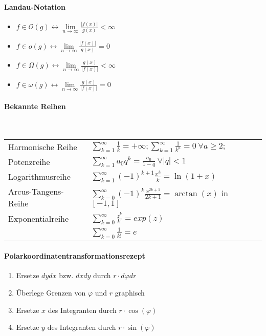 \documentclass[paper=a3,paper=landscape, fontsize=9pt, DIV=30]{scrartcl}
\newcommand{\laO}{\mathcal{O}}
\begin{document}
\begin{multicols*}{4}
		\paragraph{Landau-Notation}
		\begin{itemize}
			\item $f \in \laO(g) \leftrightarrow \lim\limits_{n \rightarrow \infty} \frac{\lvert f(x) \rvert}{g(x)} < \infty$
			\item $f \in o(g) \leftrightarrow \lim\limits_{n \rightarrow \infty} \frac{\lvert f(x) \rvert}{g(x)} = 0$
			\item $f \in \Omega(g) \leftrightarrow \lim\limits_{n \rightarrow \infty} \frac{g(x)}{\lvert f(x) \rvert} < \infty$
			\item $f \in \omega(g) \leftrightarrow \lim\limits_{n \rightarrow \infty} \frac{g(x)}{\lvert f(x) \rvert} = 0$
		\end{itemize}
		

        \paragraph{Bekannte Reihen}\hspace{0pt}\\
        \begin{tabular}{ll}
	        Harmonische Reihe &  $\sum_{k=1}^{\infty}\frac{1}{k}=+\infty; \sum_{k=1}^{\infty}\frac{1}{k^a}=0 \ \forall a \geq 2;$\vspace{2pt}\\\vspace{1pt}
	        Potenzreihe & $\sum_{k=1}^{\infty}a_0q^k=\frac{a_0}{1-q} \ \forall |q| < 1$\\\vspace{2pt}
	        Logarithmusreihe & $\sum_{k=1}^{\infty}(-1)^{k+1}\frac{x^k}{k} = \ln(1+x)$\\\vspace{2pt}
	        Arcus-Tangens-Reihe & $\sum_{k=0}^{\infty}(-1)^k\frac{x^{2k+1}}{2k+1} = \arctan(x)$ in $[-1,1]$\\\vspace{2pt}
	        Exponentialreihe & $\sum_{k=0}^{\infty} \frac{z^k}{k!} = exp(z)$\\
	        & $\sum_{k=0}^{\infty} \frac{1}{k!} = e$
        \end{tabular}

		\paragraph{Polarkoordinatentransformationsrezept}
		\begin{enumerate}
			\item Ersetze $dydx$ bzw. $dxdy$ durch $r \cdot d\varphi dr$
			\item Überlege Grenzen von $\varphi$ und $r$ graphisch
			\item Ersetze $x$ des Integranten durch $r\cdot \cos(\varphi)$
			\item Ersetze $y$ des Integranten durch $r\cdot \sin(\varphi)$
		\end{enumerate}

\end{multicols*}
\end{document}
